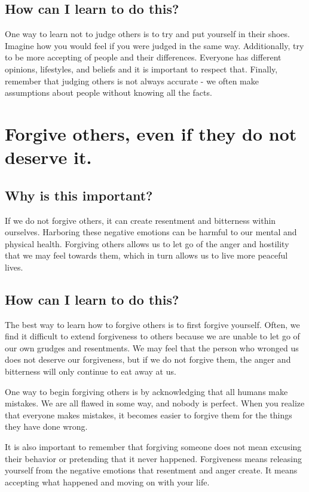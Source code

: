 \documentclass[11pt]{article}
\begin{document}
\subsection{How can I learn to do this?}
\label{sec:org45c8c6f}
One way to learn not to judge others is to try and put yourself in their shoes. Imagine how you would feel if you were judged in the same way. Additionally, try to be more accepting of people and their differences. Everyone has different opinions, lifestyles, and beliefs and it is important to respect that. Finally, remember that judging others is not always accurate - we often make assumptions about people without knowing all the facts.

\section{Forgive others, even if they do not deserve it.}
\label{sec:org9d72d9d}
\subsection{Why is this important?}
\label{sec:org6e09a50}
If we do not forgive others, it can create resentment and bitterness within ourselves. Harboring these negative emotions can be harmful to our mental and physical health. Forgiving others allows us to let go of the anger and hostility that we may feel towards them, which in turn allows us to live more peaceful lives.

\subsection{How can I learn to do this?}
\label{sec:org79c9708}
The best way to learn how to forgive others is to first forgive yourself. Often, we find it difficult to extend forgiveness to others because we are unable to let go of our own grudges and resentments. We may feel that the person who wronged us does not deserve our forgiveness, but if we do not forgive them, the anger and bitterness will only continue to eat away at us.

One way to begin forgiving others is by acknowledging that all humans make mistakes. We are all flawed in some way, and nobody is perfect. When you realize that everyone makes mistakes, it becomes easier to forgive them for the things they have done wrong.

It is also important to remember that forgiving someone does not mean excusing their behavior or pretending that it never happened. Forgiveness means releasing yourself from the negative emotions that resentment and anger create. It means accepting what happened and moving on with your life.
\end{document}
